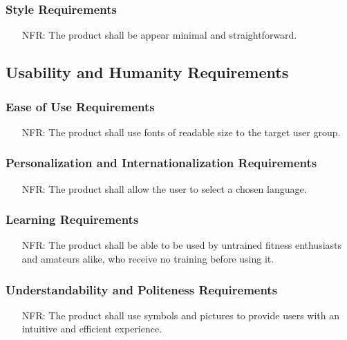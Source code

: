 \documentclass[12pt]{article}
\newcounter{nfrnum} %
\begin{document}
\subsubsection{Style Requirements}
\noindent \begin{itemize}
	\item[NFR\refstepcounter{nfrnum}\thenfrnum:]
	The product shall be appear minimal and straightforward.
\end{itemize}
\subsection{Usability and Humanity Requirements}
\subsubsection{Ease of Use Requirements}
\noindent \begin{itemize}
	\item[NFR\refstepcounter{nfrnum}\thenfrnum:]
	The product shall use fonts of readable size to the target user group.
\end{itemize}
\subsubsection{Personalization and Internationalization Requirements}
\noindent \begin{itemize}
	\item[NFR\refstepcounter{nfrnum}\thenfrnum:]
	The product shall allow the user to select a chosen language.
\end{itemize}
\subsubsection{Learning Requirements}
\noindent \begin{itemize}
	\item[NFR\refstepcounter{nfrnum}\thenfrnum:]
	The product shall be able to be used by untrained fitness enthusiasts and amateurs alike, who receive no training before using it.
\end{itemize}
\subsubsection{Understandability and Politeness Requirements}
\noindent \begin{itemize}
	\item[NFR\refstepcounter{nfrnum}\thenfrnum:]
	The product shall use symbols and pictures to provide users with an intuitive and efficient experience.
\end{itemize}
\end{document}
